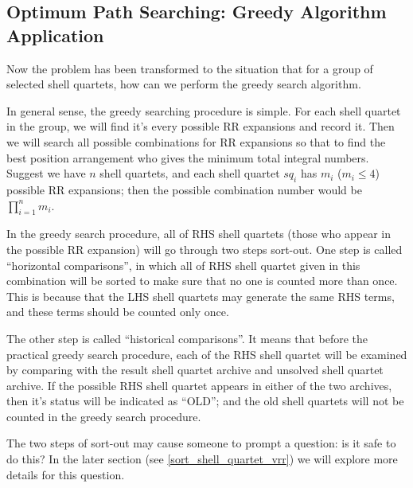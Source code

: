 \subsection{Optimum Path Searching: Greedy Algorithm Application}
%
%
\label{vrr_sq_search2}

Now the problem has been transformed to the situation that for a group of 
selected shell quartets, how can we perform the greedy search algorithm.

In general sense, the greedy searching procedure is simple. For each shell
quartet in the group, we will find it's every possible RR expansions and 
record it. Then we will search all possible combinations for RR expansions 
so that to find the best position arrangement who gives the minimum 
total integral numbers. Suggest we have $n$ shell quartets, and each
shell quartet $sq_{i}$ has $m_{i}$ ($m_{i} \leq 4$) possible RR expansions;
then the possible combination number would be $\prod_{i=1}^{n} m_{i}$.

In the greedy search procedure, all of RHS shell quartets (those who appear
in the possible RR expansion) will go through two steps sort-out. One
step is called ``horizontal comparisons'', in which all of RHS shell quartet
given in this combination will be sorted to make sure that no one is counted 
more than once. This is because that the LHS shell quartets may generate 
the same RHS terms, and these terms should be counted only once.

The other step is called ``historical comparisons''. It means that before 
the practical greedy search procedure, each of the RHS shell quartet will be 
examined by comparing with the result shell quartet archive and unsolved 
shell quartet archive. If the possible RHS shell quartet appears in either 
of the two archives, then it's status will be indicated as ``OLD''; and the 
old shell quartets will not be counted in the greedy search procedure.

The two steps of sort-out may cause someone to prompt a question: is it safe
to do this? In the later section (see \ref{sort_shell_quartet_vrr}) we will
explore more details for this question.

